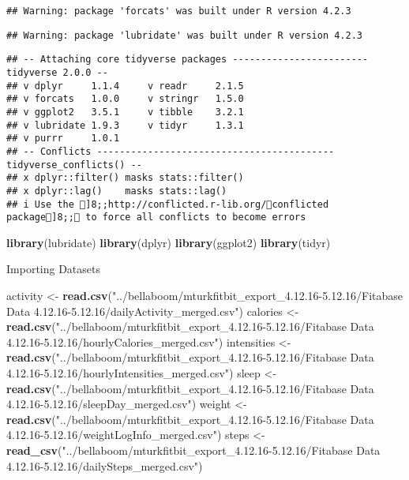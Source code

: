 \documentclass[
]{article}
\newenvironment{Shaded}{\begin{snugshade}}{\end{snugshade}}
\newcommand{\FunctionTok}[1]{\textcolor[rgb]{0.13,0.29,0.53}{\textbf{#1}}}
\newcommand{\NormalTok}[1]{#1}
\newcommand{\OtherTok}[1]{\textcolor[rgb]{0.56,0.35,0.01}{#1}}
\newcommand{\StringTok}[1]{\textcolor[rgb]{0.31,0.60,0.02}{#1}}
\begin{document}
\begin{verbatim}
## Warning: package 'forcats' was built under R version 4.2.3
\end{verbatim}

\begin{verbatim}
## Warning: package 'lubridate' was built under R version 4.2.3
\end{verbatim}

\begin{verbatim}
## -- Attaching core tidyverse packages ------------------------ tidyverse 2.0.0 --
## v dplyr     1.1.4     v readr     2.1.5
## v forcats   1.0.0     v stringr   1.5.0
## v ggplot2   3.5.1     v tibble    3.2.1
## v lubridate 1.9.3     v tidyr     1.3.1
## v purrr     1.0.1     
## -- Conflicts ------------------------------------------ tidyverse_conflicts() --
## x dplyr::filter() masks stats::filter()
## x dplyr::lag()    masks stats::lag()
## i Use the ]8;;http://conflicted.r-lib.org/conflicted package]8;; to force all conflicts to become errors
\end{verbatim}

\begin{Shaded}
\begin{Highlighting}[]
\FunctionTok{library}\NormalTok{(lubridate)}
\FunctionTok{library}\NormalTok{(dplyr)}
\FunctionTok{library}\NormalTok{(ggplot2)}
\FunctionTok{library}\NormalTok{(tidyr)}
\end{Highlighting}
\end{Shaded}

Importing Datasets

\begin{Shaded}
\begin{Highlighting}[]
\NormalTok{activity }\OtherTok{\textless{}{-}} \FunctionTok{read.csv}\NormalTok{(}\StringTok{"../bellaboom/mturkfitbit\_export\_4.12.16{-}5.12.16/Fitabase Data 4.12.16{-}5.12.16/dailyActivity\_merged.csv"}\NormalTok{)}
\NormalTok{calories }\OtherTok{\textless{}{-}} \FunctionTok{read.csv}\NormalTok{(}\StringTok{"../bellaboom/mturkfitbit\_export\_4.12.16{-}5.12.16/Fitabase Data 4.12.16{-}5.12.16/hourlyCalories\_merged.csv"}\NormalTok{)}
\NormalTok{intensities }\OtherTok{\textless{}{-}} \FunctionTok{read.csv}\NormalTok{(}\StringTok{"../bellaboom/mturkfitbit\_export\_4.12.16{-}5.12.16/Fitabase Data 4.12.16{-}5.12.16/hourlyIntensities\_merged.csv"}\NormalTok{)}
\NormalTok{sleep }\OtherTok{\textless{}{-}} \FunctionTok{read.csv}\NormalTok{(}\StringTok{"../bellaboom/mturkfitbit\_export\_4.12.16{-}5.12.16/Fitabase Data 4.12.16{-}5.12.16/sleepDay\_merged.csv"}\NormalTok{)}
\NormalTok{weight }\OtherTok{\textless{}{-}} \FunctionTok{read.csv}\NormalTok{(}\StringTok{"../bellaboom/mturkfitbit\_export\_4.12.16{-}5.12.16/Fitabase Data 4.12.16{-}5.12.16/weightLogInfo\_merged.csv"}\NormalTok{)}
\NormalTok{steps }\OtherTok{\textless{}{-}} \FunctionTok{read\_csv}\NormalTok{(}\StringTok{"../bellaboom/mturkfitbit\_export\_4.12.16{-}5.12.16/Fitabase Data 4.12.16{-}5.12.16/dailySteps\_merged.csv"}\NormalTok{)}
\end{Highlighting}
\end{Shaded}
\end{document}
